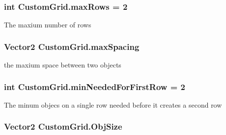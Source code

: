 \subsubsection[{\texorpdfstring{max\+Rows}{maxRows}}]{\setlength{\rightskip}{0pt plus 5cm}int Custom\+Grid.\+max\+Rows = 2}\hypertarget{class_custom_grid_a74432277987a0e6cc02d0db891ec77ba}{}\label{class_custom_grid_a74432277987a0e6cc02d0db891ec77ba}


The maxium number of rows 

\subsubsection[{\texorpdfstring{max\+Spacing}{maxSpacing}}]{\setlength{\rightskip}{0pt plus 5cm}Vector2 Custom\+Grid.\+max\+Spacing}\hypertarget{class_custom_grid_a068ef9a666cd31142751320e2a653025}{}\label{class_custom_grid_a068ef9a666cd31142751320e2a653025}


the maxium space between two objects 

\subsubsection[{\texorpdfstring{min\+Needed\+For\+First\+Row}{minNeededForFirstRow}}]{\setlength{\rightskip}{0pt plus 5cm}int Custom\+Grid.\+min\+Needed\+For\+First\+Row = 2}\hypertarget{class_custom_grid_a985fc1fc02418d3286ffbd41c98417a5}{}\label{class_custom_grid_a985fc1fc02418d3286ffbd41c98417a5}


The minum objecs on a single row needed before it creates a second row 

\subsubsection[{\texorpdfstring{Obj\+Size}{ObjSize}}]{\setlength{\rightskip}{0pt plus 5cm}Vector2 Custom\+Grid.\+Obj\+Size}\hypertarget{class_custom_grid_a0cf591b7ae82c985d1983171d9391712}{}\label{class_custom_grid_a0cf591b7ae82c985d1983171d9391712}


